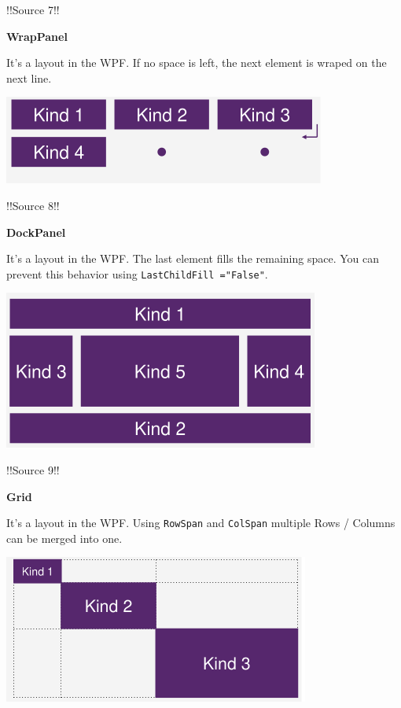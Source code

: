 \documentclass[10pt,twoside,landscape]{article}
\begin{document}
\begin{multicols}{3}
!!Source 7!!

\textbf{WrapPanel}

It's a layout in the WPF.
If no space  is left, the next element is wraped on the next line.

\begin{center}
\includegraphics[width=.9\linewidth]{img/wrap_panel_horizontal.png}
\end{center}

!!Source 8!!

\textbf{DockPanel}

It's a layout in the WPF.
The last element fills the remaining space.
You can prevent this behavior using \texttt{LastChildFill ="False"}.

\begin{center}
\includegraphics[width=.9\linewidth]{img/dockpanel_version_one.png}
\end{center}

!!Source 9!!

\textbf{Grid}

It's a layout in the WPF.
Using \texttt{RowSpan} and \texttt{ColSpan} multiple Rows / Columns can be merged into one.

\begin{center}
\includegraphics[width=.9\linewidth]{img/grid_layout.png}
\end{center}


\end{multicols}
\end{document}
